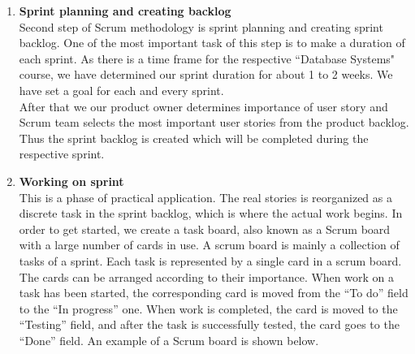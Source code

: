 \begin{enumerate}

\item \textbf{Sprint planning and creating backlog}\\
Second step of Scrum methodology is sprint planning and creating sprint backlog. One of the most important task of this step is to make a duration of each sprint. As there is a time frame for the respective ``Database Systems" course, we have determined our sprint duration for about 1 to 2 weeks. We have set a goal for each and every sprint.\\
After that we our product owner determines importance of user story and Scrum team selects the most important user stories from the product backlog. Thus the sprint backlog is created which will be completed during the respective sprint.

\item \textbf{Working on sprint}\\
This is a phase of practical application. The real stories is reorganized as a discrete task in the sprint backlog, which is where the actual work begins. In order to get started, we create a task board, also known as a Scrum board with a large number of cards in use. A scrum board is mainly a collection of tasks of a sprint. Each task is represented by a single card in a scrum board. The cards can be arranged according to their importance. When work on a task has been started, the corresponding card is moved from the “To do” field to the “In progress” one. When work is completed, the card is moved to the “Testing” field, and after the task is successfully tested, the card goes to the “Done” field. An example of a Scrum board is shown below.


\end{enumerate}
